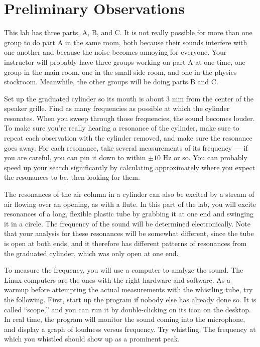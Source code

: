 \section{Preliminary Observations}

\observations

This lab has three parts, A, B, and C.  It is not really
possible for more than one group to do part A in the same
room, both because their sounds interfere with one another
and because the noise becomes annoying for everyone.  Your
instructor will probably have three groups working on part A
at one time, one group in the main room, one in the small
side room, and one in the physics stockroom.  Meanwhile, the
other groups will be doing parts B and C.


Set up the graduated cylinder so its mouth is about 3 mm from the center of the speaker grille.
Find as many frequencies as possible
at which the cylinder resonates.  When you sweep through those frequencies, the
sound becomes louder.  To make sure you're really hearing
a resonance of the cylinder, make sure to repeat each
observation with the cylinder removed, and make sure the
resonance goes away.
  For each resonance, take
several measurements of its frequency --- if you are
careful, you can pin it down to within $\pm 10$ Hz or so.  You
can probably speed up your search significantly by
calculating approximately where you expect the resonances to
be, then looking for them.


The resonances of the air column in a cylinder can also be
excited by a stream of air flowing over an opening, as with
a flute.  In this part of the lab, you will excite
resonances of a long, flexible plastic tube by grabbing it
at one end and swinging it in a circle.  The frequency of
the sound will be determined electronically. Note that your
analysis for these resonances will be somewhat different,
since the tube is open at both ends, and it therefore has
different patterns of resonances from the graduated
cylinder, which was only open at one end.

To measure the frequency, you will use a computer to analyze
the sound. The Linux computers are the ones with the right hardware and software.
As a warmup before attempting the actual
measurements with the whistling tube, try the following. 
First, start up the program if nobody else has already done
so.  It is called ``scope,'' and you can run it by double-clicking
on its icon on the desktop. 
In real time, the program will monitor the sound coming into the
microphone, and display a graph of loudness versus frequency.
Try whistling. The frequency at which you whistled should show
up as a prominent peak. 


